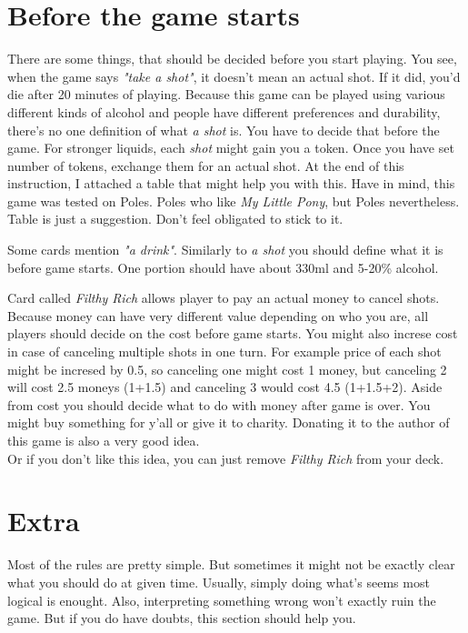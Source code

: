 \documentclass[notitlepage]{article}
\begin{document}
\section{Before the game starts}
There are some things, that should be decided before you start playing. You see, when the game says \textsl{"take a shot"}, it doesn't mean an actual shot. If it did, you'd die after 20 minutes of playing. Because this game can be played using various different kinds of alcohol and people have different preferences and durability, there's no one definition of what \textsl{a shot} is. You have to decide that before the game. For stronger liquids, each \textsl{shot} might gain you a token. Once you have set number of tokens, exchange them for an actual shot. At the end of this instruction, I attached a table that might help you with this. Have in mind, this game was tested on Poles. Poles who like \textsl{My Little Pony}, but Poles nevertheless. Table is just a suggestion. Don't feel obligated to stick to it.

Some cards mention \textsl{"a drink"}. Similarly to \textsl{a shot} you should define what it is before game starts. One portion should have about 330ml and 5-20\% alcohol.

Card called \textsl{Filthy Rich} allows player to pay an actual money to cancel shots. Because money can have very different value depending on who you are, all players should decide on the cost before game starts. You might also increse cost in case of canceling multiple shots in one turn. For example price of each shot might be incresed by 0.5, so canceling one might cost 1 money, but canceling 2 will cost 2.5 moneys (1+1.5) and canceling 3 would cost 4.5 (1+1.5+2).\newline
Aside from cost you should decide what to do with money after game is over. You might buy something for y'all or give it to charity. Donating it to the author of this game is also a very good idea. \\
Or if you don't like this idea, you can just remove \textsl{Filthy Rich} from your deck.

\section{Extra}
Most of the rules are pretty simple. But sometimes it might not be exactly clear what you should do at given time. Usually, simply doing what's seems most logical is enought. Also, interpreting something wrong won't exactly ruin the game. But if you do have doubts, this section should help you.
\end{document}
